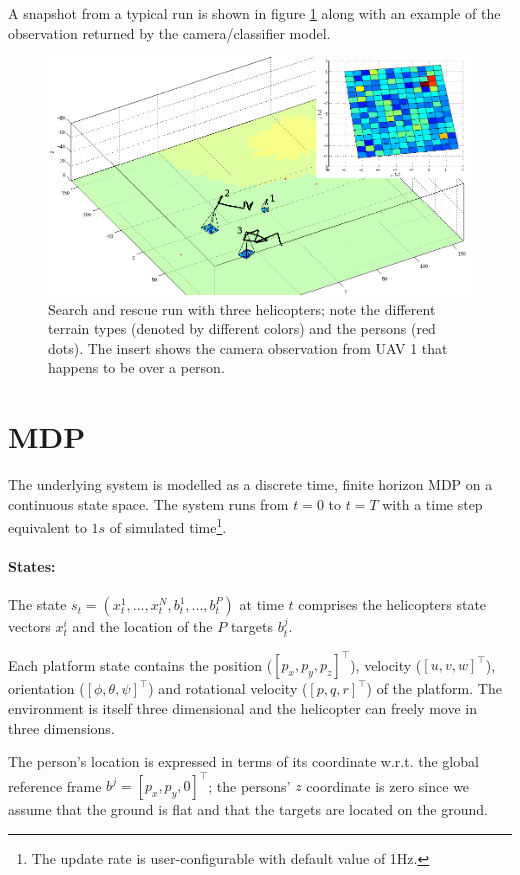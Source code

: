 \documentclass[a4paper,11pt]{report}
\begin{document}
A snapshot from a typical run is shown in figure \ref{fig:searchrescue} along with an example of the observation returned by the camera/classifier model.
\begin{figure}[ht]
\centering
\includegraphics[width=15cm]{searchrescue.jpg}
\caption{Search and rescue run with three helicopters; note the different terrain types (denoted by different colors) and the persons (red dots). The insert shows the camera observation from UAV 1 that happens to be over a person. \label{fig:searchrescue}}
\end{figure}

\section{MDP}
The underlying system is modelled as a discrete time, finite horizon MDP on a continuous state space. The system runs from $t=0$ to $t=T$ with a time step equivalent to $1s$ of simulated time\footnote{The update rate is user-configurable with default value of 1Hz.}.

\paragraph{States:} The state $s_t=(x^1_t,...,x^{N}_t,b^1_t,...,b^P_t)$ at time $t$ comprises the helicopters state vectors $x^i_t$ and the location of the $P$ targets $b^j_t$.

Each platform state contains the position ($[p_x,p_y,p_z]^\intercal$), velocity ($[u,v,w]^\intercal$), orientation ($[\phi,\theta,\psi]^\intercal$) and rotational velocity ($[p,q,r]^\intercal$) of the platform. 
The environment is itself three dimensional and the helicopter can freely move in three dimensions.

The person's location is expressed in terms of its coordinate w.r.t. the global reference frame  $b^j=[p_x,p_y,0]^\intercal$; the persons' $z$ coordinate is zero since we assume that the ground is flat and that the targets are located on the ground.
\end{document}
